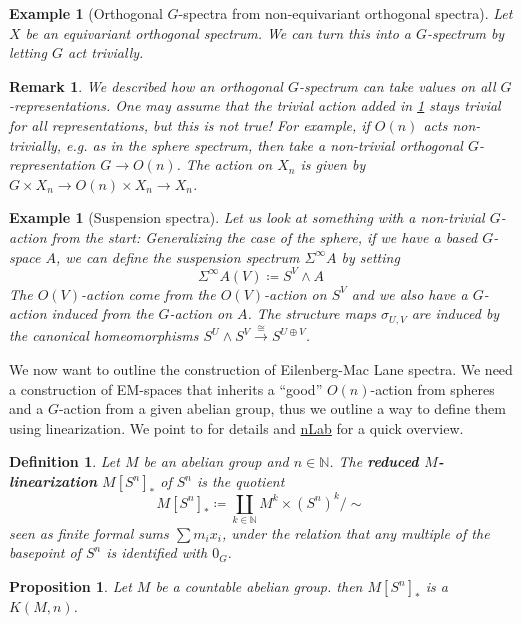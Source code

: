 \documentclass{scrartcl}
\newcommand{\textbi}[1]{\textbf{\textit{#1}}}
\newcommand{\bN}{\mathbb{N}}
\newtheorem{defin}[subsection]{Definition}
\newtheorem{prop}[subsection]{Proposition}
\newtheorem{rem}[subsection]{Remark}
\newtheorem{ex}[subsection]{Example}
\begin{document}
\begin{ex}[Orthogonal $G$-spectra from non-equivariant orthogonal spectra]\label{triv}
    Let $X$ be an equivariant orthogonal spectrum. We can turn this into a $G$-spectrum by letting $G$ act trivially.
\end{ex}

\begin{rem}
    We described how an orthogonal $G$-spectrum can take values on all $G$-representations. One may assume that the trivial action added in \ref{triv} stays trivial for all representations, but this is not true! For example, if $O(n)$ acts non-trivially, e.g. as in the sphere spectrum, then take a non-trivial orthogonal $G$-representation $G\to O(n)$. The action on $X_n$ is given by $G\times X_n\to O(n)\times X_n\to X_n$.
\end{rem}

\begin{ex}[Suspension spectra]
    Let us look at something with a non-trivial $G$-action from the start: Generalizing the case of the sphere, if we have a based $G$-space $A$, we can define the suspension spectrum $\Sigma^\infty A$ by setting $$\Sigma^\infty A(V)\coloneqq S^V\wedge A$$
    The $O(V)$-action come from the $O(V)$-action on $S^V$ and we also have a $G$-action induced from the $G$-action on $A$. The structure maps $\sigma_{U,V}$ are induced by the canonical homeomorphisms $S^U\wedge S^V\xrightarrow{\cong} S^{U\oplus V}$.
\end{ex}

We now want to outline the construction of Eilenberg-Mac Lane spectra. We need a construction of EM-spaces that inherits a ``good'' $O(n)$-action from spheres and a $G$-action from a given abelian group, thus we outline a way to define them using linearization. We point to \cite[6.4]{AGP} for details and \href{https://ncatlab.org/nlab/show/Eilenberg-Mac+Lane+space#via_linearization_of_spheres}{nLab} for a quick overview.

\begin{defin}
    Let $M$ be an abelian group and $n\in \bN$. The \textbi{reduced $M$-linearization} $M[S^n]_*$ of $S^n$ is the quotient $$M[S^n]_*\coloneqq \coprod_{k\in\bN}M^k\times (S^n)^k\big/\sim$$
    seen as finite formal sums $\sum m_ix_i$, under the relation that any multiple of the basepoint of $S^n$ is identified with $0_G$. 
\end{defin}

\begin{prop}
    Let $M$ be a countable abelian group. then $M[S^n]_*$ is a $K(M,n)$.
\end{prop}
\end{document}
